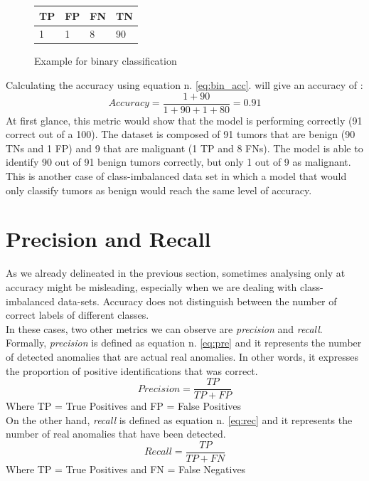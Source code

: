 \begin{figure}[h]
\centering
\begin{tabular}{ p{1cm} p{2cm} p{2cm} p{2cm}}
 TP&FP&FN&TN\\
 \hline
    1 & 1& 8& 90\\
\end{tabular}
\caption{Example for binary classification}
\label{fig:tumor}
\end{figure}
Calculating the accuracy using equation n. \ref{eq:bin_acc}. will give an accuracy of :
 \begin{equation}
Accuracy = \dfrac{1+90}{1+90+1+80} = 0.91
\label{eq:bin_acc2}    
  \end{equation}
At first glance, this metric would show that the model is performing correctly (91 correct out of a 100). The dataset is composed of 91 tumors that are benign (90 TNs and 1 FP) and 9 that are malignant (1 TP and 8 FNs). The model is able to identify 90 out of 91 benign tumors correctly, but only 1 out of 9 as malignant. This is another case of class-imbalanced data set in which a model that would only classify tumors as benign would reach the same level of accuracy. \cite{google_doc}\\



\section{Precision and Recall}
As we already delineated in the previous section, sometimes analysing only at accuracy might be misleading, especially when we are dealing with class-imbalanced data-sets. Accuracy does not distinguish between the number of correct labels of different classes. \cite{metrics}\\
In these cases, two other metrics we can observe are \textit{precision} and \textit{recall}. \\
Formally, \textit{precision} is defined as equation n. \ref{eq:pre} and it represents the number of detected anomalies that are actual real anomalies.\cite{tatbul2019precision}
In other words, it expresses the proportion of positive identifications that was correct. 
\begin{equation}
Precision = \dfrac{TP}{TP+FP}
\label{eq:pre}    
\end{equation}
Where TP = True Positives and FP = False Positives\\
On the other hand, \textit{recall} is defined as equation n. \ref{eq:rec} and it represents the number of real anomalies that have been detected.\cite{tatbul2019precision}
\begin{equation}
Recall = \dfrac{TP}{TP+FN}
\label{eq:rec}    
\end{equation}
Where TP = True Positives and FN = False Negatives\\

